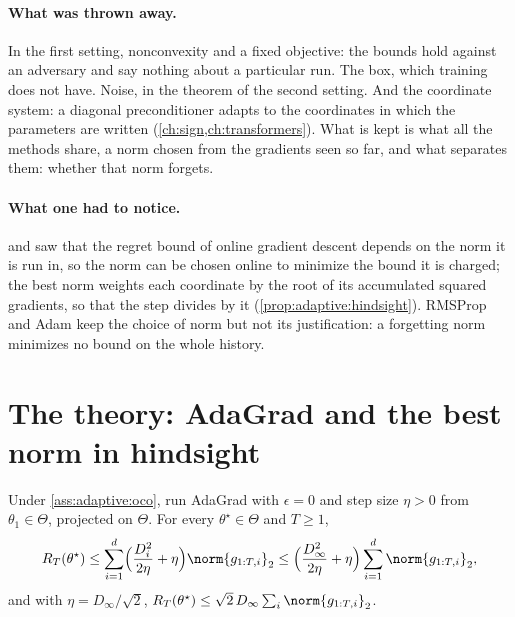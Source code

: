 \begin{refsection}
\paragraph{What was thrown away.} In the first setting, nonconvexity and a fixed objective: the bounds hold against an adversary and say nothing about a particular run. The box, which training does not have. Noise, in the theorem of the second setting. And the coordinate system: a diagonal preconditioner adapts to the coordinates in which the parameters are written (\cref{ch:sign,ch:transformers}). What is kept is what all the methods share, a norm chosen from the gradients seen so far, and what separates them: whether that norm forgets.

\paragraph{What one had to notice.} \Textcite{McMahanStreeter2010} and \textcite{DuchiHazanSinger2011} saw that the regret bound of online gradient descent depends on the norm it is run in, so the norm can be chosen online to minimize the bound it is charged; the best norm weights each coordinate by the root of its accumulated squared gradients, so that the step divides by it (\cref{prop:adaptive:hindsight}). RMSProp and Adam keep the choice of norm but not its justification: a forgetting norm minimizes no bound on the whole history.

\section{The theory: AdaGrad and the best norm in hindsight}\label{sec:adaptive:adagrad}

\begin{theorem}\label{thm:adaptive:adagrad}
Under \cref{ass:adaptive:oco}, run AdaGrad with $\epsilon=0$ and step size $\eta>0$ from $\theta_1\in\Theta$, projected on $\Theta$. For every $\theta^\star\in\Theta$ and $T\ge1$,
\begin{equation}\label{eq:adaptive:adagrad}
  R_T(\theta^\star)\le\sum_{i=1}^d\Bigl(\frac{D_i^2}{2\eta}+\eta\Bigr)\norm{g_{1:T,i}}_2\le\Bigl(\frac{D_\infty^2}{2\eta}+\eta\Bigr)\sum_{i=1}^d\norm{g_{1:T,i}}_2 ,
\end{equation}
and with $\eta=D_\infty/\sqrt2$, $R_T(\theta^\star)\le\sqrt2\,D_\infty\sum_i\norm{g_{1:T,i}}_2$.
\end{theorem}


\end{refsection}
